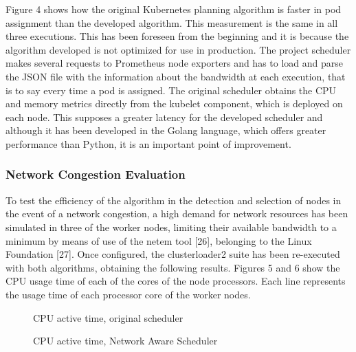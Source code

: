 \documentclass[conference]{IEEEtran}
\begin{document}
Figure 4 shows how the original Kubernetes planning algorithm is faster in pod assignment than the developed algorithm. This measurement is the same in all three executions. This has been foreseen from 
the beginning and it is because the algorithm developed is not optimized for use in production. The project scheduler makes several requests to Prometheus node exporters and has to load and parse the JSON 
file with the information about the bandwidth at each execution, that is to say every time a pod is assigned. The original scheduler obtains the CPU and memory metrics directly from the kubelet component, 
which is deployed on each node. This supposes a greater latency for the developed scheduler and although it has been developed in the Golang language, which offers greater performance than Python, it is an 
important point of improvement.

\subsubsection{Network Congestion Evaluation}\label{sec:netcongest}

To test the efficiency of the algorithm in the detection and selection of nodes in the event of a network congestion, a high demand for network resources has been simulated in three of the worker nodes, 
limiting their available bandwidth to a minimum by means of use of the netem tool [26], belonging to the Linux Foundation [27]. Once configured, the clusterloader2 suite has been re-executed with both 
algorithms, obtaining the following results. Figures 5 and 6 show the CPU usage time of each of the cores of the node processors. Each line represents the usage time of each processor core of the worker 
nodes.

\begin{figure}[t]
\begin{center}
\strut{}
\caption{CPU active time, original scheduler}\label{fig:cluster}
\end{center}
\end{figure}

\begin{figure}[h]
\begin{center}
\strut{}
\caption{CPU active time, Network Aware Scheduler}\label{fig:cluster}
\end{center}
\end{figure}
\end{document}
